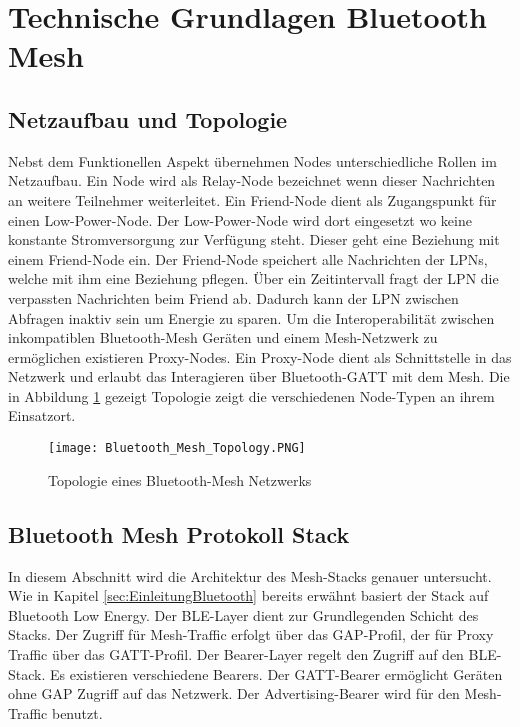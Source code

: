 \clearpage
\section{Technische Grundlagen Bluetooth Mesh}\label{sec:TechnischeGrundlagenBluetoothMesh}




\subsection{Netzaufbau und Topologie}\label{sec:NetzaufbauundTopologie}

Nebst dem Funktionellen Aspekt übernehmen Nodes unterschiedliche Rollen im Netzaufbau. Ein Node wird als Relay-Node bezeichnet wenn dieser Nachrichten an weitere Teilnehmer weiterleitet. Ein Friend-Node dient als Zugangspunkt für einen Low-Power-Node. Der Low-Power-Node wird dort eingesetzt wo keine konstante Stromversorgung zur Verfügung steht. Dieser geht eine Beziehung mit einem Friend-Node ein. Der Friend-Node speichert alle Nachrichten der LPNs, welche mit ihm eine Beziehung pflegen. Über ein Zeitintervall fragt der LPN die verpassten Nachrichten beim Friend ab. Dadurch kann der LPN zwischen Abfragen inaktiv sein um Energie zu sparen. Um die Interoperabilität zwischen inkompatiblen Bluetooth-Mesh Geräten und einem Mesh-Netzwerk zu ermöglichen existieren Proxy-Nodes. Ein Proxy-Node dient als Schnittstelle in das Netzwerk und erlaubt das Interagieren über Bluetooth-GATT mit dem Mesh. Die in Abbildung \ref{fig:BTMeshTopology} gezeigt Topologie zeigt die verschiedenen Node-Typen an ihrem Einsatzort. 

\begin{figure} [H]
	\centering
	\texttt{[image: Bluetooth\_Mesh\_Topology.PNG]}
	\caption{Topologie eines Bluetooth-Mesh Netzwerks \cite{bluetooth_sig_mesh_netzwerk_spezifikationen_2020}} 
	\label{fig:BTMeshTopology}
\end{figure}






\subsection{Bluetooth Mesh Protokoll Stack}\label{sec:ZigbeeProtokollStack}

In diesem Abschnitt wird die Architektur des Mesh-Stacks genauer untersucht. Wie in Kapitel \ref{sec:EinleitungBluetooth} bereits erwähnt basiert der Stack auf Bluetooth Low Energy. Der BLE-Layer dient zur Grundlegenden Schicht des Stacks. Der Zugriff für Mesh-Traffic erfolgt über das GAP-Profil, der für Proxy Traffic über das GATT-Profil. Der Bearer-Layer regelt den Zugriff auf den BLE-Stack. Es existieren verschiedene Bearers. Der GATT-Bearer ermöglicht Geräten ohne GAP Zugriff auf das Netzwerk. Der Advertising-Bearer wird für den Mesh-Traffic benutzt. \\

